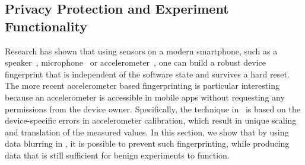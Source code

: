 
\subsection{Privacy Protection and Experiment Functionality}\label{sec-experiment}



Research has shown that using sensors on a modern smartphone, such as 
a speaker~\cite{das2014poster}, microphone~\cite{clarkson2012breaking} 
or accelerometer~\cite{bojinov2014mobile, dey2014accelprint}, one can 
build a robust device fingerprint that is independent of the software state
and survives a hard reset. The more recent accelerometer based fingerprinting
is particular interesting because an accelerometer is accessible in mobile apps
without requesting any permissions from the device owner. Specifically, the 
technique in~\cite{bojinov2014mobile} is based on the device-specific errors in 
accelerometer calibration, which result in unique scaling and translation of 
the measured values. In this section, we show that by using data blurring in 
\sysname, it is possible to prevent such fingerprinting, while producing data that
is still sufficient for benign experiments to function. 


